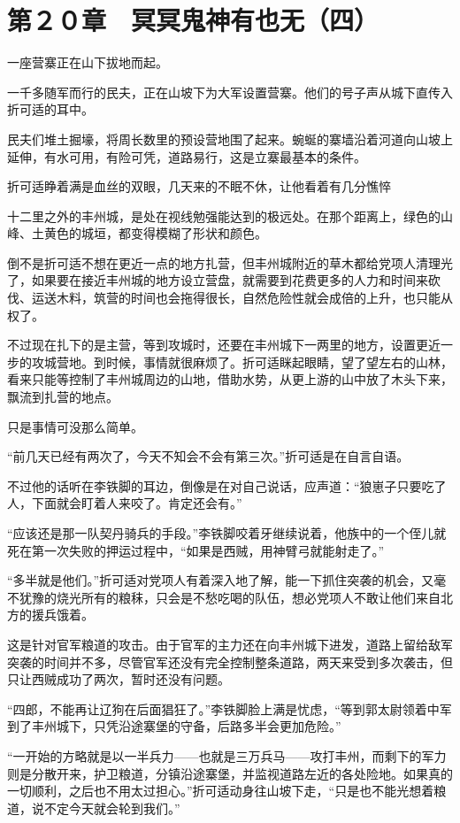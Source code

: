 \section{第２０章　冥冥鬼神有也无（四）}

一座营寨正在山下拔地而起。

一千多随军而行的民夫，正在山坡下为大军设置营寨。他们的号子声从城下直传入折可适的耳中。

民夫们堆土掘壕，将周长数里的预设营地围了起来。蜿蜒的寨墙沿着河道向山坡上延伸，有水可用，有险可凭，道路易行，这是立寨最基本的条件。

折可适睁着满是血丝的双眼，几天来的不眠不休，让他看着有几分憔悴

十二里之外的丰州城，是处在视线勉强能达到的极远处。在那个距离上，绿色的山峰、土黄色的城垣，都变得模糊了形状和颜色。

倒不是折可适不想在更近一点的地方扎营，但丰州城附近的草木都给党项人清理光了，如果要在接近丰州城的地方设立营盘，就需要到花费更多的人力和时间来砍伐、运送木料，筑营的时间也会拖得很长，自然危险性就会成倍的上升，也只能从权了。

不过现在扎下的是主营，等到攻城时，还要在丰州城下一两里的地方，设置更近一步的攻城营地。到时候，事情就很麻烦了。折可适眯起眼睛，望了望左右的山林，看来只能等控制了丰州城周边的山地，借助水势，从更上游的山中放了木头下来，飘流到扎营的地点。

只是事情可没那么简单。

“前几天已经有两次了，今天不知会不会有第三次。”折可适是在自言自语。

不过他的话听在李铁脚的耳边，倒像是在对自己说话，应声道：“狼崽子只要吃了人，下面就会盯着人来咬了。肯定还会有。”

“应该还是那一队契丹骑兵的手段。”李铁脚咬着牙继续说着，他族中的一个侄儿就死在第一次失败的押运过程中，“如果是西贼，用神臂弓就能射走了。”

“多半就是他们。”折可适对党项人有着深入地了解，能一下抓住突袭的机会，又毫不犹豫的烧光所有的粮秣，只会是不愁吃喝的队伍，想必党项人不敢让他们来自北方的援兵饿着。

这是针对官军粮道的攻击。由于官军的主力还在向丰州城下进发，道路上留给敌军突袭的时间并不多，尽管官军还没有完全控制整条道路，两天来受到多次袭击，但只让西贼成功了两次，暂时还没有问题。

“四郎，不能再让辽狗在后面猖狂了。”李铁脚脸上满是忧虑，“等到郭太尉领着中军到了丰州城下，只凭沿途寨堡的守备，后路多半会更加危险。”

“一开始的方略就是以一半兵力——也就是三万兵马——攻打丰州，而剩下的军力则是分散开来，护卫粮道，分镇沿途寨堡，并监视道路左近的各处险地。如果真的一切顺利，之后也不用太过担心。”折可适动身往山坡下走，“只是也不能光想着粮道，说不定今天就会轮到我们。”

